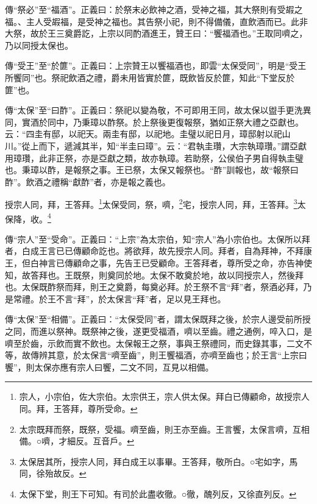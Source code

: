 {\noindent\zhuan{}\fzbyks 傳“祭必”至“福酒”。正義曰：於祭末必飲神之酒，受神之福，其大祭則有受嘏之福。、主人受嘏福，是受神之福也。其告祭小祀，則不得備儀，直飲酒而已。此非大祭，故於王三奠爵訖，上宗以同酌酒進王，贊王曰：“饗福酒也。”王取同嚌之，乃以同授太保也。 \par}

{\noindent\zhuan{}\fzbyks 傳“受王”至“於篚”。正義曰：上宗贊王以饗福酒也，即雲“太保受同”，明是“受王所饗同”也。祭祀飲酒之禮，爵未用皆實於篚，既飲皆反於篚，知此“下堂反於篚”也。 \par}

{\noindent\zhuan{}\fzbyks 傳“太保”至“曰酢”。正義曰：祭祀以變為敬，不可即用王同，故太保以盥手更洗異同，實酒於同中，乃秉璋以酢祭。於上祭後更復報祭，猶如正祭大禮之亞獻也。云：“四圭有邸，以祀天。兩圭有邸，以祀地。圭璧以祀日月，璋邸射以祀山川。”從上而下，遞減其半，知“半圭曰璋”。云：“君執圭瓚，大宗執璋瓚。”謂亞獻用璋瓚，此非正祭，亦是亞獻之類，故亦執璋。若助祭，公侯伯子男自得執圭璧也。秉璋以酢，是報祭之事。王已祭，太保又報祭也。“酢”訓報也，故“報祭曰酢”。飲酒之禮稱“獻酢”者，亦是報之義也。 \par}

授宗人同，拜，王答拜。\footnote{宗人，小宗伯，佐大宗伯。太宗供王，宗人供太保。拜白已傳顧命，故授宗人同。拜，王答拜，尊所受命。}太保受同，祭，嚌，\footnote{太宗既拜而祭，既祭，受福。嚌至齒，則王亦至齒。王言饗，太保言嚌，互相備。○嚌，才細反。互音戶。}宅，授宗人同，拜，王答拜。\footnote{太保居其所，授宗人同，拜白成王以事畢。王答拜，敬所白。○宅如字，馬同，徐殆故反。}太保降，收。\footnote{太保下堂，則王下可知。有司於此盡收徹。○徹，醜列反，又徐直列反。}

{\noindent\zhuan{}\fzbyks 傳“宗人”至“受命”。正義曰：“上宗”為太宗伯，知“宗人”為小宗伯也。太保所以拜者，白成王言已已傳顧命訖也。將欲拜，故先授宗人同。拜者，自為拜神，不拜康王，但白神言已傳顧命之事，先告王已受顧命。王答拜者，尊所受之命，亦告神使知，故答拜也。王既祭，則奠同於地。太保不敢奠於地，故以同授宗人，然後拜也。太保既酢祭而拜，則王之奠爵，每奠必拜。於王祭不言“拜”者，祭酒必拜，乃是常禮。於王不言“拜”，於太保言“拜”者，足以見王拜也。 \par}

{\noindent\zhuan{}\fzbyks 傳“太保”至“相備”。正義曰：“太保受同”者，謂太保既拜之後，於宗人邊受前所授之同，而進以祭神。既祭神之後，遂更受福酒，嚌以至齒。禮之通例，啐入口，是嚌至於齒，示飲而實不飲也。太保報王之祭，事與王祭禮同，而史錄其事，二文不等，故傳辨其意，於太保言“嚌至齒”，則王饗福酒，亦嚌至齒也；於王言“上宗曰饗”，則太保亦應有宗人曰饗，二文不同，互見以相備。 \par}

